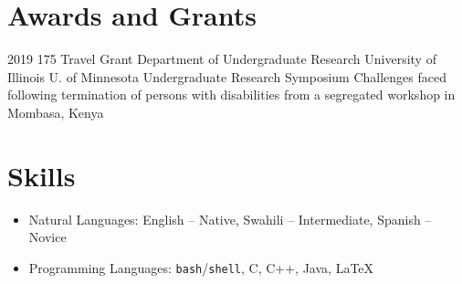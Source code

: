 \documentclass{cv}
\begin{document}

\section{Awards and Grants}
\secitemgrant
	{2019}
	{175}
	{Travel Grant}
	{Department of Undergraduate Research}
	{University of Illinois}
	{U. of Minnesota Undergraduate Research Symposium}
	{Challenges faced following termination of persons with disabilities from a segregated workshop in Mombasa, Kenya}

\section{Skills}
\begin{itemize}
  \item Natural Languages: English -- Native, Swahili -- Intermediate, Spanish -- Novice
  \item Programming Languages: {\texttt {bash}}/{\texttt {shell}}, C, C++, Java, \LaTeX
\end{itemize}

%
%
\end{document}
